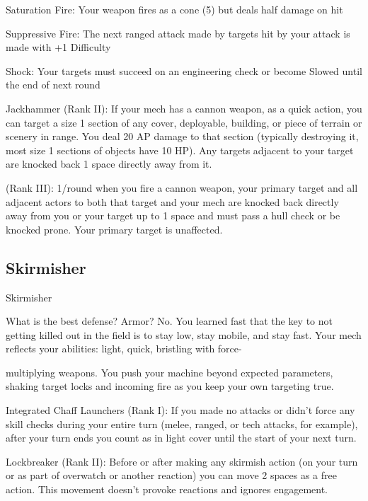          Saturation Fire: Your weapon fires as a cone (5) but deals half damage on hit
 

                                                                                                                 


         Suppressive Fire: The next ranged attack made by targets hit by your attack is made with  
         +1 Difficulty
 
         Shock: Your targets must succeed on an engineering check or become Slowed until the  
         end of next round
 
Jackhammer (Rank II): If your mech has a cannon weapon, as a quick action, you can target a  
size 1 section of any cover, deployable, building, or piece of terrain or scenery in range. You deal  
20 AP damage to that section (typically destroying it, most size 1 sections of objects have 10  
HP). Any targets adjacent to your target are knocked back 1 space directly away from it.
 
(Rank III): 1/round when you fire a cannon weapon, your primary target and all adjacent actors to  
both that target and your mech are knocked back directly away from you or your target up to 1  
space and must pass a hull check or be knocked prone. Your primary target is unaffected.
 
\subsection{Skirmisher}

                                                   Skirmisher  

What is the best defense? Armor? No. You learned fast that the key to not getting killed out in the field is to  
stay low, stay mobile, and stay fast. Your mech reflects your abilities: light, quick, bristling with force- 

multiplying weapons. You push your machine beyond expected parameters, shaking target locks and  
incoming fire as you keep your own targeting true.   

Integrated Chaff Launchers (Rank I): If you made no attacks or didn’t force any skill checks  
during your entire turn (melee, ranged, or tech attacks, for example), after your turn ends you  
count as in light cover until the start of your next turn.
 
Lockbreaker (Rank II): Before or after making any skirmish action (on your turn or as part of  
overwatch or another reaction) you can move 2 spaces as a free action. This movement doesn’t  
provoke reactions and ignores engagement.
 
